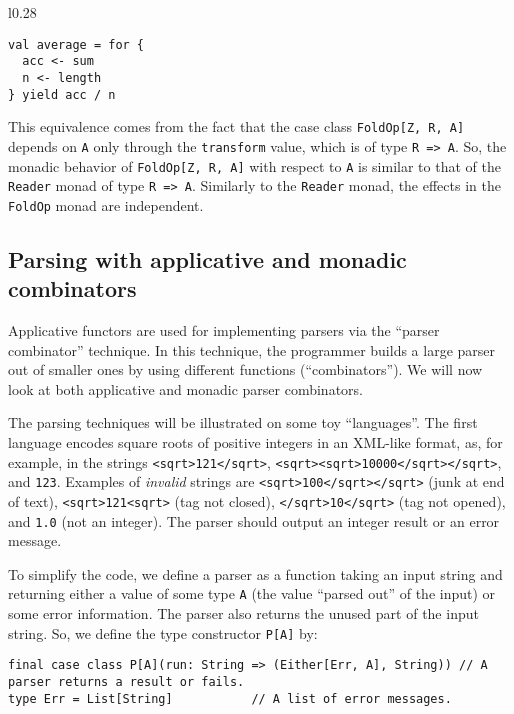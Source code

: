 \begin{wrapfigure}{l}{0.28\columnwidth}%
\vspace{-1\baselineskip}
\begin{lstlisting}
val average = for {
  acc <- sum
  n <- length
} yield acc / n
\end{lstlisting}

\vspace{-1\baselineskip}
\end{wrapfigure}%

\noindent This equivalence comes from the fact that the case class
\lstinline!FoldOp[Z, R, A]! depends on \lstinline!A! only through
the \lstinline!transform! value, which is of type \lstinline!R => A!.
So, the monadic behavior of \lstinline!FoldOp[Z, R, A]! with respect
to \lstinline!A! is similar to that of the \lstinline!Reader! monad
of type \lstinline!R => A!. Similarly to the \lstinline!Reader!
monad, the effects in the \lstinline!FoldOp! monad are independent.

\subsection{Parsing with applicative and monadic combinators\label{subsec:Parsing-with-applicative-and-monadic-parsers}}

Applicative functors are used for implementing parsers via the \textsf{``}parser
combinator\textsf{''} technique. In this technique, the programmer builds
a large parser out of smaller ones by using different functions (\textsf{``}combinators\textsf{''}).
We will now look at both applicative and monadic parser combinators.

The parsing techniques will be illustrated on some toy \textsf{``}languages\textsf{''}.
The first language encodes square roots of positive integers in an
XML-like format, as, for example, in the strings \lstinline!<sqrt>121</sqrt>!,
\lstinline!<sqrt><sqrt>10000</sqrt></sqrt>!, and \lstinline!123!.
Examples of \emph{invalid} strings are \lstinline!<sqrt>100</sqrt></sqrt>!
(junk at end of text), \lstinline!<sqrt>121<sqrt>! (tag not closed),
\lstinline!</sqrt>10</sqrt>! (tag not opened), and \lstinline!1.0!
(not an integer). The parser should output an integer result or an
error message.

To simplify the code, we define a parser as a function taking an input
string and returning either a value of some type \lstinline!A! (the
value \textsf{``}parsed out\textsf{''} of the input) or some error information. The
parser also returns the unused part of the input string. So, we define
the type constructor \lstinline!P[A]! by:
\begin{lstlisting}
final case class P[A](run: String => (Either[Err, A], String)) // A parser returns a result or fails.
type Err = List[String]           // A list of error messages.
\end{lstlisting}

